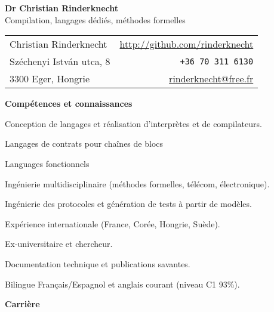 \documentclass[a4paper,11pt]{article}
\begin{document}
\begin{center}
\textbf{\LARGE Dr Christian Rinderknecht}\\[5mm]
{\large Compilation, langages dédiés, méthodes formelles}
\end{center}

\noindent
\begin{tabular}{@{}l@{\qquad\qquad\qquad\qquad}r@{}}
  Christian Rinderknecht
& \url{http://github.com/rinderknecht}\\
  Széchenyi István utca, 8
& \texttt{+36 70 311 6130}\\
  3300 Eger, Hongrie
& \url{rinderknecht@free.fr}
\end{tabular}

\medskip


\pagestyle{empty}

\bigskip
\noindent\textbf{\large Compétences et connaissances}
\begin{itemize*}

  \item Conception de langages et réalisation d'interprètes et de
    compilateurs.

  \item Langages de contrats pour chaînes de blocs

  \item Languages fonctionnels

  \item Ingénierie multidisciplinaire (méthodes formelles, télécom,
    électronique).

  \item Ingénierie des protocoles et génération de tests à partir de
    modèles.

  \item Expérience internationale (France, Corée, Hongrie, Suède).

  \item Ex-universitaire et chercheur.

  \item Documentation technique et publications savantes.

  \item Bilingue Français/Espagnol et anglais courant (niveau C1 93\%).

\end{itemize*}

\bigskip

\noindent\textbf{\large Carrière}
\bigskip
\end{document}
